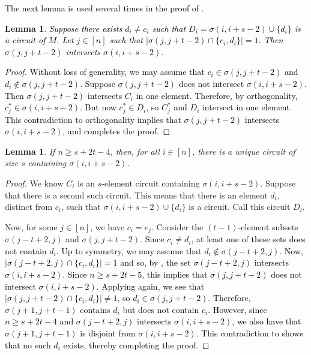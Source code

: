 \documentclass[11pt]{amsart}
\newtheorem{lemma}[theorem]{Lemma}
\newcommand{\bloo}{\textcolor{black}}
\begin{document}
\bloo{The next lemma is used several times in the proof of .}

\begin{lemma}
\label{circ_unique_helper}
\bloo{Suppose there exists $d_i \neq c_i$ such that $D_i = \sigma(i,i+s-2) \cup \{d_i\}$ is a circuit of $M$. Let $j \in [n]$ such that $|\sigma(j,j+t-2) \cap \{c_i,d_i\}| = 1$. Then $\sigma(j,j+t-2)$ intersects $\sigma(i,i+s-2)$.}
\end{lemma}

\begin{proof}
\bloo{Without loss of generality, we may assume that \bloo{$c_i \in \sigma(j,j+t-2)$} and \bloo{$d_i \notin \sigma(j,j+t-2)$}. Suppose $\sigma(j,j+t-2)$ does not intersect $\sigma(i,i+s-2)$. Then $\sigma(j,j+t-2)$ intersects $C_i$ in one element. Therefore, by orthogonality, \bloo{$c_j^* \in \sigma(i,i+s-2)$}. But now $c_j^* \in D_i$, so $C_j^*$ and $D_i$ intersect in one element. This contradiction to orthogonality implies that $\sigma(j,j+t-2)$ intersects $\sigma(i,i+s-2)$, and completes the proof.}
\end{proof}

\begin{lemma}
\label{circ_unique}
If $n \geq s+2t-4$, then, for all $i \in [n]$, there is a unique circuit of size $s$ containing $\sigma(i, i+s-2)$.
\end{lemma}

\begin{proof}
We know $C_i$ is an $s$-element circuit containing $\sigma(i, i+s-2)$. Suppose that there is a second such circuit. This means that there is an element $d_i$, distinct from $c_i$, such that $\sigma(i, i+s-2)\cup \{d_i\}$ is a circuit. Call this circuit $D_i$.

Now, for some \bloo{$j \in [n]$}, we have $c_i = e_j$. Consider the $(t-1)$-element subsets $\sigma(j-t+2, j)$ and $\sigma(j, j+t-2)$. \bloo{Since $c_i \neq d_i$, at least one of these sets does not contain $d_i$. Up to symmetry, we may assume that $d_i \notin \sigma(j-t+2,j)$. Now, $|\sigma(j-t+2,j) \cap \{c_i,d_i\}|=1$ and so, by , the set $\sigma(j-t+2,j)$ intersects $\sigma(i,i+s-2)$. Since $n \geq s+2t-5$, this implies that $\sigma(j,j+t-2)$ does not intersect $\sigma(i,i+s-2)$. Applying  again, we see that $|\sigma(j,j+t-2) \cap \{c_i,d_i\}| \neq 1$, so $d_i \in \sigma(j,j+t-2)$. Therefore, $\sigma(j+1,j+t-1)$ contains $d_i$ but does not contain $c_i$. However, since $n \geq s+2t-4$ and $\sigma(j-t+2,j)$ intersects $\sigma(i,i+s-2)$, we also have that $\sigma(j+1,j+t-1)$ is disjoint from $\sigma(i,i+s-2)$. This contradiction to  shows that no such $d_i$ exists, thereby completing the proof.}
\end{proof}
\end{document}

